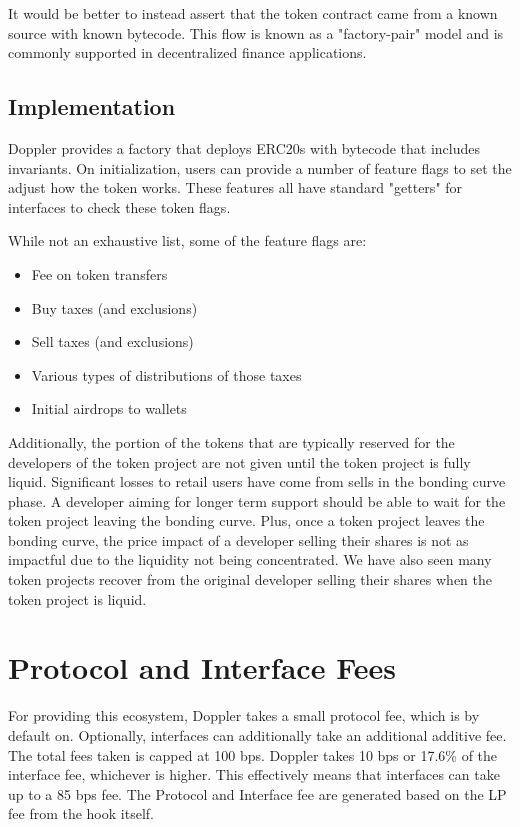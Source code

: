 \documentclass[sigconf,nonacm,prologue,table]{acmart}
\numberwithin{equation}{section}
\theoremstyle{definition}
\theoremstyle{remark}
\begin{document}
It would be better to instead assert that the token contract came from a known source with known bytecode. This flow is known as a "factory-pair" model and is commonly supported in decentralized finance applications.

\subsection{Implementation}

Doppler provides a factory that deploys ERC20s with bytecode that includes invariants. On initialization, users can provide a number of feature flags to set the adjust how the token works. These features all have standard "getters" for interfaces to check these token flags.

While not an exhaustive list, some of the feature flags are:

\begin{itemize}
    \item Fee on token transfers
    \item Buy taxes (and exclusions)
    \item Sell taxes (and exclusions)
    \item Various types of distributions of those taxes
    \item Initial airdrops to wallets
\end{itemize}

Additionally, the portion of the tokens that are typically reserved for the developers of the token project are not given until the token project is fully liquid. Significant losses to retail users have come from sells in the bonding curve phase. A developer aiming for longer term support should be able to wait for the token project leaving the bonding curve. Plus, once a token project leaves the bonding curve, the price impact of a developer selling their shares is not as impactful due to the liquidity not being concentrated. We have also seen many token projects recover from the original developer selling their shares when the token project is liquid. 

\section{Protocol and Interface Fees}

For providing this ecosystem, Doppler takes a small protocol fee, which is by default on.  Optionally, interfaces can additionally take an additional additive fee. The total fees taken is capped at 100 bps. Doppler takes 10 bps or 17.6\% of the interface fee, whichever is higher. This effectively means that interfaces can take up to a 85 bps fee. The Protocol and Interface fee are generated based on the LP fee from the hook itself. 
\end{document}
